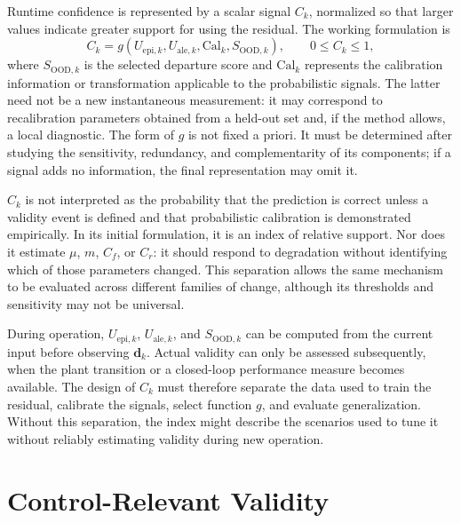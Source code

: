 \documentclass[12pt,a4paper]{report}
\begin{document}
Runtime confidence is represented by a scalar signal $C_k$, normalized so that larger values indicate greater support for using the residual. The working formulation is
\begin{equation}
    C_k
    =
    g\!\left(
        U_{\mathrm{epi},k},
        U_{\mathrm{ale},k},
        \mathrm{Cal}_k,
        S_{\mathrm{OOD},k}
    \right),
    \qquad 0\leq C_k\leq 1,
    \label{eq:runtime_confidence_signal}
\end{equation}
where $S_{\mathrm{OOD},k}$ is the selected departure score and $\mathrm{Cal}_k$ represents the calibration information or transformation applicable to the probabilistic signals. The latter need not be a new instantaneous measurement: it may correspond to recalibration parameters obtained from a held-out set and, if the method allows, a local diagnostic. The form of $g$ is not fixed a priori. It must be determined after studying the sensitivity, redundancy, and complementarity of its components; if a signal adds no information, the final representation may omit it.

$C_k$ is not interpreted as the probability that the prediction is correct unless a validity event is defined and that probabilistic calibration is demonstrated empirically. In its initial formulation, it is an index of relative support. Nor does it estimate $\mu$, $m$, $C_f$, or $C_r$: it should respond to degradation without identifying which of those parameters changed. This separation allows the same mechanism to be evaluated across different families of change, although its thresholds and sensitivity may not be universal.

During operation, $U_{\mathrm{epi},k}$, $U_{\mathrm{ale},k}$, and $S_{\mathrm{OOD},k}$ can be computed from the current input before observing $\mathbf{d}_k$. Actual validity can only be assessed subsequently, when the plant transition or a closed-loop performance measure becomes available. The design of $C_k$ must therefore separate the data used to train the residual, calibrate the signals, select function $g$, and evaluate generalization. Without this separation, the index might describe the scenarios used to tune it without reliably estimating validity during new operation.

\section{Control-Relevant Validity}
\label{sec:validez_relevante_control}

%
\end{document}
